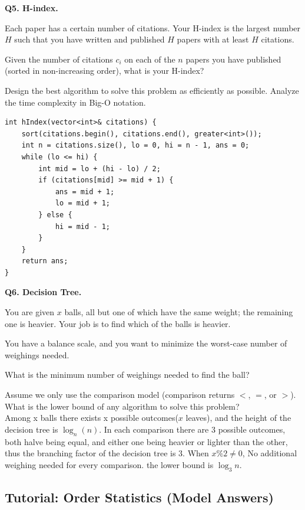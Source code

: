 \documentclass[9pt]{extarticle}
\begin{document}
\textbf{Q5. H-index.}  

Each paper has a certain number of citations. Your H-index is the largest number $H$ such that you have written and published $H$ papers with at least $H$ citations.  

Given the number of citations $c_i$ on each of the $n$ papers you have published (sorted in non-increasing order), what is your H-index?  

Design the best algorithm to solve this problem as efficiently as possible. Analyze the time complexity in Big-O notation.  
\begin{lstlisting}
int hIndex(vector<int>& citations) {
    sort(citations.begin(), citations.end(), greater<int>()); 
    int n = citations.size(), lo = 0, hi = n - 1, ans = 0;
    while (lo <= hi) {
        int mid = lo + (hi - lo) / 2;
        if (citations[mid] >= mid + 1) {   
            ans = mid + 1;
            lo = mid + 1;
        } else {                           
            hi = mid - 1;
        }
    }
    return ans;
}
\end{lstlisting}
\vspace{1em}

\textbf{Q6. Decision Tree.}  

You are given $x$ balls, all but one of which have the same weight; the remaining one is heavier. Your job is to find which of the balls is heavier.  

You have a balance scale, and you want to minimize the worst-case number of weighings needed.  

What is the minimum number of weighings needed to find the ball?  

Assume we only use the comparison model (comparison returns $<$, $=$, or $>$). What is the lower bound of any algorithm to solve this problem?  \\
Among x balls there exists x possible outcomes($x$ leaves), and the height of the decision tree is $\log_n(n)$. 
In each comparison there are 3 possible outcomes, both halve being equal, and either one being heavier or lighter
than the other, thus the branching factor of the decision tree is 3. When $x \% 2 \neq 0$, No additional weighing needed for every comparison.   the lower bound is $\log_3n$.

\subsection{Tutorial: Order Statistics (Model Answers)}
\end{document}
